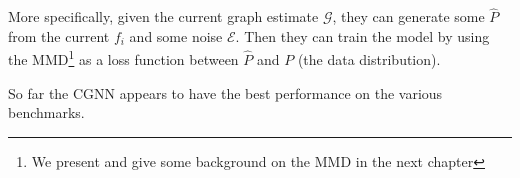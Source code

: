More specifically, given the current graph estimate $\mathcal{G}$, they can generate some $\hat{P}$
from the current $f_i$ and some noise $\mathcal{E}$. Then they can train the model by using 
the MMD\footnote{We present and give some background on the MMD in the next chapter} 
as a loss function between $\hat{P}$ and $P$ (the data distribution).

So far the CGNN appears to have the best performance on the various benchmarks. 










